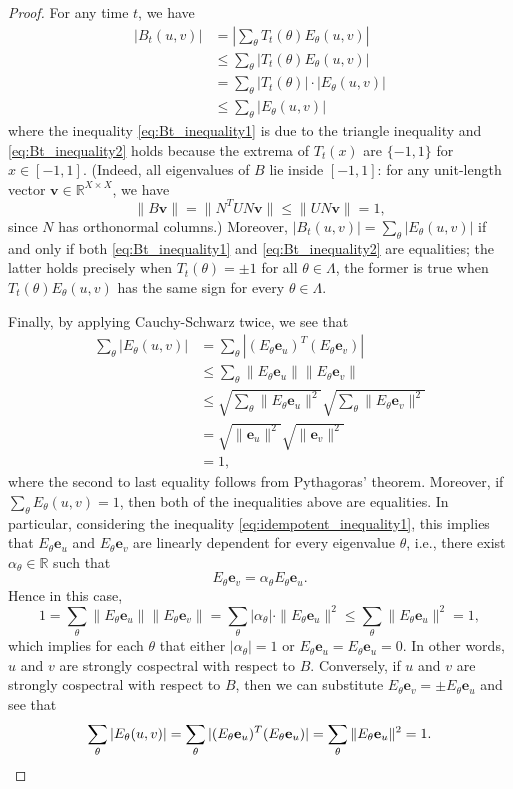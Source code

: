 \documentclass{article}
\numberwithin{equation}{section}
\newcommand\re{{\mathbb R}}%
\newcommand\Ze{{\mathbf e}}
\newcommand\Zv{{\mathbf v}}
\begin{document}
\begin{proof}
For any time $t$, we have
\begin{align}
    \nonumber |B_t(u,v)| &= \left| \sum_{\theta} T_t(\theta) E_{\theta}(u,v) \right| \\
    \label{eq:Bt_inequality1} &\leq \sum_{\theta} |T_t(\theta) E_{\theta}(u,v) | \\
    \nonumber &=  \sum_{\theta}| T_t(\theta)| \cdot |E_{\theta}(u,v)| \\
     \label{eq:Bt_inequality2} &\leq  \sum_{\theta} |E_{\theta}(u,v)|
\end{align}
where the inequality \eqref{eq:Bt_inequality1} is due to  the triangle inequality and \eqref{eq:Bt_inequality2} holds because the extrema of $T_t(x)$ are $\{-1,1\}$ for $x \in [-1,1]$. (Indeed, all eigenvalues of $B$ lie inside $[-1,1]$: for any unit-length vector $\Zv \in \re^{X \times X}$, we have
\[
\|B\Zv\| = \|N^TUN\Zv\| \leq \|U N\Zv\| = 1,
\]
since $N$ has orthonormal columns.) Moreover, $|B_t(u,v)| = \sum_{\theta} |E_{\theta} (u,v)|$ if and only if both \eqref{eq:Bt_inequality1} and \eqref{eq:Bt_inequality2} are equalities; the latter holds precisely when $T_{t}(\theta) = \pm 1$ for all $\theta \in \Lambda$, the former is true when $T_t(\theta)E_\theta(u,v)$ has the same sign for every $\theta \in \Lambda$.

Finally, by applying Cauchy-Schwarz twice, we see that
\begin{align}
\nonumber\sum_\theta |E_{\theta}(u,v)| &= \sum_{\theta}|(E_\theta\Ze_u)^T (E_\theta\Ze_v)| \\
\label{eq:idempotent_inequality1}&\leq \sum_{\theta} \|E_\theta\Ze_u\|\|E_\theta\Ze_v\| \\
\nonumber &\leq \sqrt{ \sum_{\theta} \|E_\theta\Ze_u\|^2} \sqrt{\sum_{\theta} \|E_\theta\Ze_v\|^2} \\
\nonumber&= \sqrt{\|\Ze_u\|^2}\sqrt{\|\Ze_v\|^2} \\
\nonumber&= 1,
\end{align}
where the second to last equality follows from  Pythagoras' theorem.
Moreover, if $\sum_{\theta}E_{\theta}(u,v) = 1$, then both of the inequalities above are equalities. In particular, considering  the inequality \eqref{eq:idempotent_inequality1}, this implies that $E_\theta\Ze_u$ and $E_\theta\Ze_v$ are linearly dependent for every eigenvalue $\theta$, i.e., there exist $\alpha_\theta \in \re$ such that
\[
E_\theta\Ze_v = \alpha_\theta E_\theta\Ze_u.
\]
Hence in this case,
\[
1 = \sum_{\theta} \|E_\theta\Ze_u\|\|E_\theta\Ze_v\| = \sum_{\theta} |\alpha_\theta|\cdot \|E_\theta\Ze_u\|^2 \leq \sum_{\theta} \|E_\theta\Ze_u\|^2 = 1,
\]
which implies for each $\theta$ that either $|\alpha_\theta| = 1$ or $E_\theta\Ze_u = E_\theta\Ze_u = 0$. In other words, $u$ and $v$ are strongly cospectral with respect to $B$. Conversely, if $u$ and $v$ are strongly cospectral with respect to $B$, then we can substitute $E_\theta\Ze_v = \pm E_\theta\Ze_u$ and see that
\[
\sum_{\theta} |E_\theta(u,v)| = \sum_{\theta}|(E_\theta\Ze_u)^T (E_\theta\Ze_u)| = \sum_{\theta} \|E_\theta\Ze_u\|^2 = 1. \qedhere
\]
\end{proof}
\end{document}
